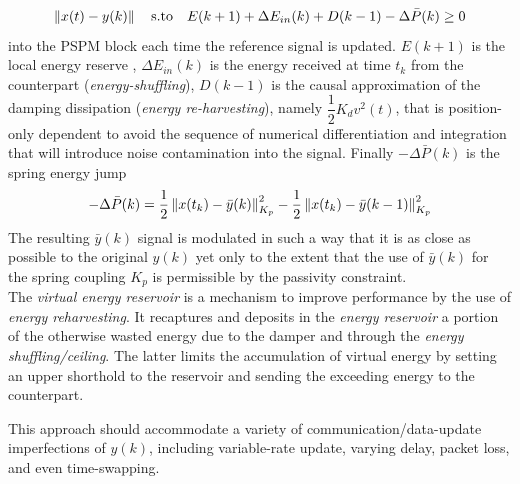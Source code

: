 \begin{equation}
	\left\lVert x(t) - y(k)\right\rVert \quad \text{s.to} \quad E(k+1) + \Delta E_{in}(k) + D(k-1) -\Delta \bar{P}(k) \geq 0
\end{equation}
 into the PSPM block each time the reference signal is updated.
 $E(k+1)$ is the local energy reserve , $\Delta E_{in}(k)$ is the energy received at time $t_{k}$ from the counterpart (\textit{energy-shuffling}), $D(k-1)$ is the causal approximation of the damping dissipation (\textit{energy re-harvesting}), namely $\dfrac{1}{2}K_{d}v^{2}(t)$, that is position-only dependent to avoid the sequence of numerical differentiation and integration that will introduce noise contamination into the signal. Finally $-\Delta \bar{P}(k)$ is the spring energy jump
 \begin{equation}
 	-\Delta \bar{P}(k) = \dfrac{1}{2}\left\lVert x(t_{k}) - \bar{y}(k)\right\rVert^{2}_{K_{p}} - \dfrac{1}{2}\left\lVert x(t_{k}) - \bar{y}(k-1)\right\rVert^{2}_{K_{p}}
 \end{equation}
 The resulting $\bar{y}(k)$ signal is modulated in such a way that it is as close as possible to the original $y(k)$ yet only to the extent that the use of $\bar{y}(k)$ for the spring coupling $K_{p}$ is permissible by the passivity constraint.\\
 The \textit{virtual energy reservoir} is a mechanism to improve performance by the use of \textit{energy reharvesting}. It recaptures and deposits in the \textit{energy reservoir}  a portion of the otherwise wasted energy due to the damper and through the \textit{energy shuffling/ceiling}. The latter limits the accumulation of virtual energy by setting an upper shorthold to the reservoir and sending the exceeding energy to the counterpart.
 
 This approach should accommodate a variety of communication/data-update imperfections of $y(k)$, including variable-rate update, varying delay, packet loss, and even time-swapping.
 
